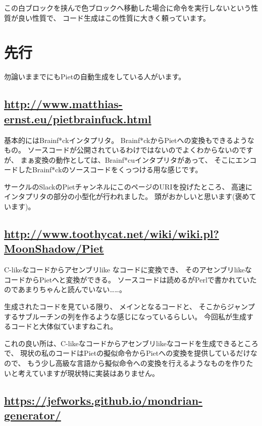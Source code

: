 この白ブロックを挟んで色ブロックへ移動した場合に命令を実行しないという性質が良い性質で、
コード生成はこの性質に大きく頼っています。

\section{先行}

勿論いままでにもPietの自動生成をしている人がいます。

\subsection{\texorpdfstring{\url{http://www.matthias-ernst.eu/pietbrainfuck.html}}{http://www.matthias-ernst.eu/pietbrainfuck.html}}

基本的にはBrainf*ckインタプリタ。
Brainf*ckからPietへの変換もできるようなもの。
ソースコードが公開されているわけではないのでよくわからないのですが、
まぁ変換の動作としては、Brainf*cuインタプリタがあって、
そこにエンコードしたBrainf*ckのソースコードをくっつける用な感じです。

サークルのSlackのPietチャンネルにこのページのURIを投げたところ、
高速にインタプリタの部分の小型化が行われました。
頭がおかしいと思います(褒めています)。

\subsection{\texorpdfstring{\url{http://www.toothycat.net/wiki/wiki.pl?MoonShadow/Piet}}{http://www.toothycat.net/wiki/wiki.pl?MoonShadow/Piet}}

C-likeなコードからアセンブリlike なコードに変換でき、 そのアセンブリlikeなコードからPietへと変換ができる。
ソースコードは読めるがPerlで書かれていたのであまりちゃんと読んでいない\dots\dots。

生成されたコードを見ている限り、 メインとなるコードと、
そこからジャンプするサブルーチンの列を作るような感じになっているらしい。
今回私が生成するコードと大体似ていますねこれ。

これの良い所は、C-likeなコードからアセンブリlikeなコードを生成できるところで、
現状の私のコードはPietの擬似命令からPietへの変換を提供しているだけなので、
もう少し高級な言語から擬似命令への変換を行えるようなものを作りたいと考えていますが現状特に実装はありません。

\subsection{\texorpdfstring{\url{https://jefworks.github.io/mondrian-generator/}}{https://jefworks.github.io/mondrian-generator/}}


